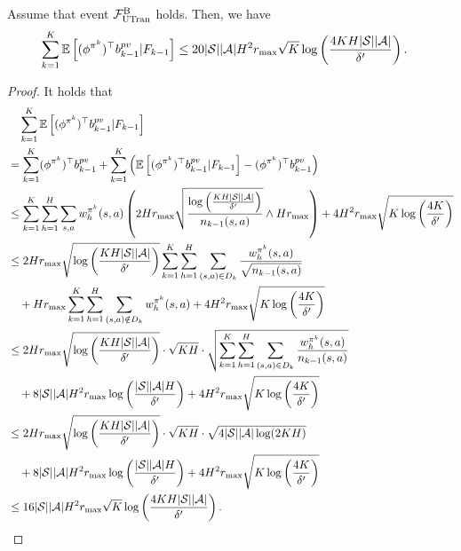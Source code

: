 \begin{lemma} \label{lemma:phi_b_pv}
	Assume that event $\mathcal{F}^{\textup{B}}_{\textup{UTran}}$ holds. Then, we have
	\begin{align*}
		\sum_{k=1}^{K} \mathbb{E}\left[  (\phi^{\pi^k})^\top b^{pv}_{k-1} | F_{k-1}  \right] &\leq 20|\mathcal{S}| |\mathcal{A}| H^{2} r_{\max} \sqrt{K } \log\left( \frac{4KH|\mathcal{S}||\mathcal{A}|}{\delta'} \right) .
	\end{align*}
\end{lemma}
\begin{proof}
	It holds that
	\begin{align*}
		&\quad \sum_{k=1}^{K} \mathbb{E}\left[  (\phi^{\pi^k})^\top b^{pv}_{k-1} | F_{k-1}  \right] 
		\\
		&= \sum_{k=1}^{K} (\phi^{\pi^k})^\top b^{pv}_{k-1} + \sum_{k=1}^{K} \left(  \mathbb{E}\left[  (\phi^{\pi^k})^\top b^{pv}_{k-1} | F_{k-1}  \right] - (\phi^{\pi^k})^\top b^{pv}_{k-1}  \right)
		\\
		&\leq \sum_{k=1}^{K} \sum_{h=1}^{H} \sum_{s,a} w^{\pi^k}_h(s,a) \left( 2H r_{\max} \sqrt{\frac{\log\left( \frac{KH|\mathcal{S}||\mathcal{A}|}{\delta'} \right)}{n_{k-1}(s,a)}} \wedge H r_{\max} \right) + 4 H^2 r_{\max} \sqrt{ K \log\left( \frac{4K}{\delta'} \right) }
		\\
		&\leq 2H r_{\max} \sqrt{\log\left( \frac{KH|\mathcal{S}||\mathcal{A}|}{\delta'} \right)} \sum_{k=1}^{K} \sum_{h=1}^{H} \sum_{(s,a) \in D_k}   \frac{w^{\pi^k}_h(s,a)}{\sqrt{n_{k-1}(s,a)}}   
		\\
		&\quad + H r_{\max} \sum_{k=1}^{K} \sum_{h=1}^{H} \sum_{(s,a) \notin D_k} w^{\pi^k}_h(s,a) + 4 H^2 r_{\max} \sqrt{ K \log\left( \frac{4K}{\delta'} \right) }
		\\
		&\leq 2H r_{\max} \sqrt{\log\left( \frac{KH|\mathcal{S}||\mathcal{A}|}{\delta'} \right)} \cdot \sqrt{KH} \cdot \sqrt{\sum_{k=1}^{K} \sum_{h=1}^{H} \sum_{(s,a) \in D_k}   \frac{w^{\pi^k}_h(s,a)}{n_{k-1}(s,a)}} 
		\\
		&\quad  + 8|\mathcal{S}||\mathcal{A}|H^2 r_{\max} \log\left( \frac{|\mathcal{S}||\mathcal{A}|H}{\delta'} \right) + 4 H^2 r_{\max} \sqrt{ K \log\left( \frac{4K}{\delta'} \right) }
		\\
		&\leq 2H r_{\max} \sqrt{\log\left( \frac{KH|\mathcal{S}||\mathcal{A}|}{\delta'} \right)} \cdot \sqrt{KH} \cdot \sqrt{4 |\mathcal{S}| |\mathcal{A}| \log(2KH)} 
		\\
		&\quad +  8|\mathcal{S}||\mathcal{A}|H^2 r_{\max} \log\left( \frac{|\mathcal{S}||\mathcal{A}|H}{\delta'} \right) + 4 H^2 r_{\max} \sqrt{ K \log\left( \frac{4K}{\delta'} \right) }
		\\
		&\leq 16|\mathcal{S}| |\mathcal{A}| H^{2} r_{\max} \sqrt{K } \log\left( \frac{4KH|\mathcal{S}||\mathcal{A}|}{\delta'} \right) .
	\end{align*}
\end{proof}



